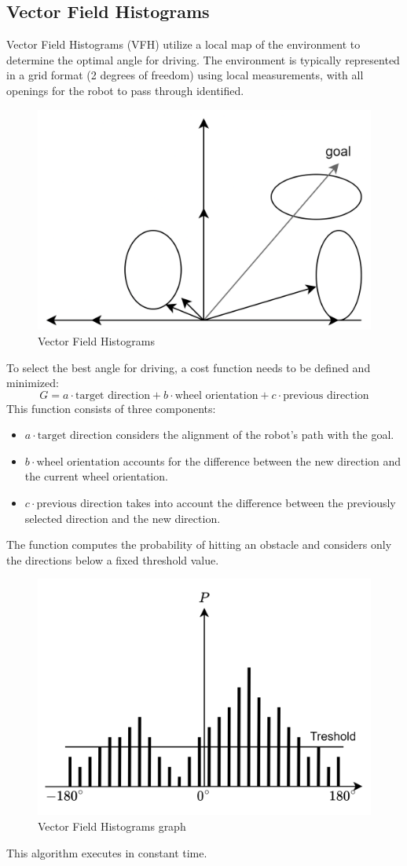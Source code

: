 \subsection{Vector Field Histograms}
Vector Field Histograms (VFH) utilize a local map of the environment to determine the optimal angle for driving. 
The environment is typically represented in a grid format (2 degrees of freedom) using local measurements, with all openings for the robot to pass through identified.
\begin{figure}[H]
    \centering
    \includegraphics[width=0.5\linewidth]{images/vfh.png}
    \caption{Vector Field Histograms}
\end{figure}
To select the best angle for driving, a cost function needs to be defined and minimized:
\[G=a\cdot\text{target direction}+b\cdot\text{wheel orientation}+c\cdot\text{previous direction}\]
This function consists of three components:
\begin{itemize}
    \item $a\cdot\text{target direction}$ considers the alignment of the robot's path with the goal.
    \item $b\cdot\text{wheel orientation}$ accounts for the difference between the new direction and the current wheel orientation.
    \item $c\cdot\text{previous direction}$ takes into account the difference between the previously selected direction and the new direction.
\end{itemize}
The function computes the probability of hitting an obstacle and considers only the directions below a fixed threshold value. 
\begin{figure}[H]
    \centering
    \includegraphics[width=0.5\linewidth]{images/fed1.png}
    \caption{Vector Field Histograms graph}
\end{figure}
This algorithm executes in constant time.

